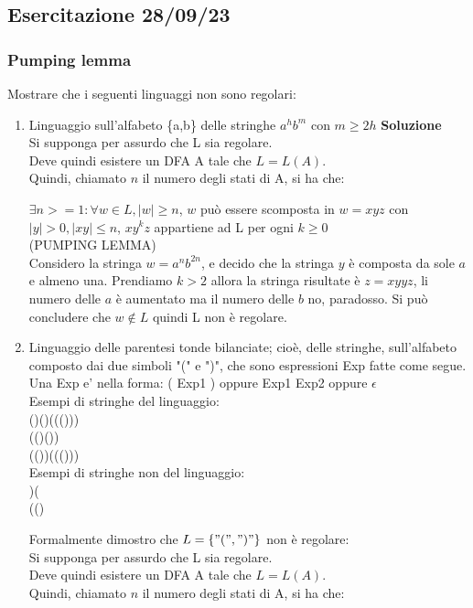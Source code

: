 \newpage
\subsection{Esercitazione 28/09/23}
\subsubsection{Pumping lemma}
Mostrare che i seguenti linguaggi non sono regolari:
\begin{enumerate}
  \item Linguaggio sull'alfabeto \{a,b\} delle stringhe $a^hb^m$ con $m\geq 2h$
\textbf{Soluzione}
\\ Si supponga per assurdo che L sia regolare.
\\ Deve quindi esistere un DFA A tale che $L=L(A)$.
\\ Quindi, chiamato $n$ il numero degli stati di A, si ha che:

$\exists n>=1: \forall w \in L, |w|\geq n$, $w$ può essere scomposta in $w=xyz$ con $|y|>0, |xy| \leq n$, 
$xy^kz$ appartiene ad L per ogni $k \geq 0$
\\ (PUMPING LEMMA)
\vspace{5mm}
\\ Considero la stringa $w=a^n b^{2n}$, e decido che la stringa $y$ è composta da sole $a$ e almeno una. Prendiamo $k>2$ allora la stringa risultate è $z=xyyz$, li numero delle $a$ è aumentato ma il numero delle $b$ no, paradosso.
Si può concludere che $w \notin L$ quindi L non è regolare.

\item Linguaggio delle parentesi tonde bilanciate; cioè, delle stringhe, sull'alfabeto composto dai due simboli "(" e ")", che sono espressioni Exp fatte come segue.
\\ Una Exp e' nella forma: ( Exp1 ) oppure Exp1 Exp2 oppure $\epsilon$
\\ Esempi di stringhe del linguaggio: 
\\ ()()((()))
\\ (()())
\\ (())((()))
\\ Esempi di stringhe non del linguaggio: 
\\ )(
\\ (()

\vspace{5mm}
Formalmente dimostro che $L=\{ "(",")"\}$ non è regolare:
\\ Si supponga per assurdo che L sia regolare.
\\ Deve quindi esistere un DFA A tale che $L=L(A)$.
\\ Quindi, chiamato $n$ il numero degli stati di A, si ha che:


\end{enumerate}
